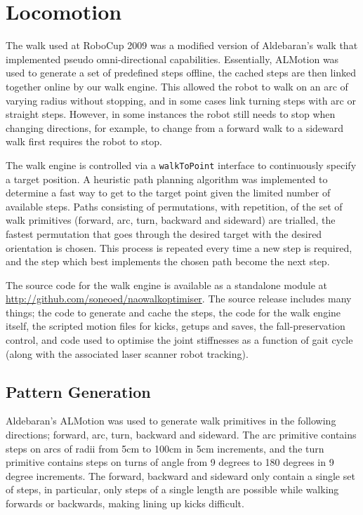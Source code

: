 \section{Locomotion}

The walk used at RoboCup 2009 was a modified version of Aldebaran's walk that implemented pseudo omni-directional capabilities. Essentially, ALMotion was used to generate a set of predefined steps offline, the cached steps are then linked together online by our walk engine. This allowed the robot to walk on an arc of varying radius without stopping, and in some cases link turning steps with arc or straight steps. However, in some instances the robot still needs to stop when changing directions, for example, to change from a forward walk to a sideward walk first requires the robot to stop.

The walk engine is controlled via a \texttt{walkToPoint} interface to continuously specify a target position. A heuristic path planning algorithm was implemented to determine a fast way to get to the target point given the limited number of available steps. Paths consisting of permutations, with repetition, of the set of walk primitives (forward, arc, turn, backward and sideward) are trialled, the fastest permutation that goes through the desired target with the desired orientation is chosen. This process is repeated every time a new step is required, and the step which best implements the chosen path become the next step.

The source code for the walk engine is available as a standalone module at \href{http://github.com/soneoed/naowalkoptimiser}{http://github.com/soneoed/naowalkoptimiser}. The source release includes many things; the code to generate and cache the steps, the code for the walk engine itself, the scripted motion files for kicks, getups and saves, the fall-preservation control, and code used to optimise the joint stiffnesses as a function of gait cycle (along with the associated laser scanner robot tracking).

\subsection{Pattern Generation}

Aldebaran's ALMotion was used to generate walk primitives in the following directions; forward, arc, turn, backward and sideward. The arc primitive contains steps on arcs of radii from 5cm to 100cm in 5cm increments, and the turn primitive contains steps on turns of angle from 9 degrees to 180 degrees in 9 degree increments. The forward, backward and sideward only contain a single set of steps, in particular, only steps of a single length are possible while walking forwards or backwards, making lining up kicks difficult.


